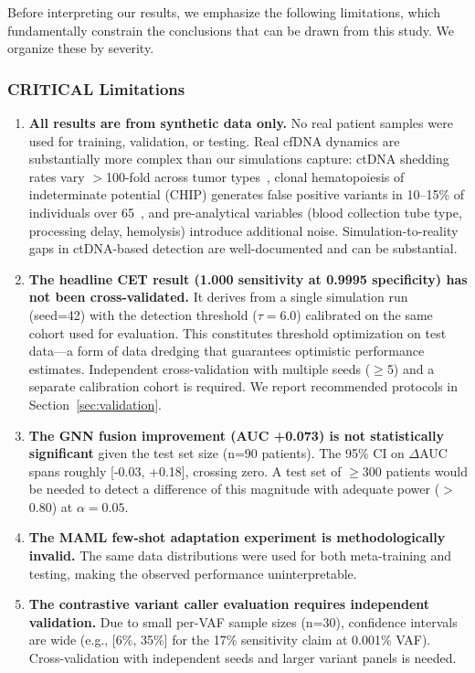 \documentclass[10pt,a4paper]{article}
\begin{document}
Before interpreting our results, we emphasize the following limitations, which fundamentally constrain the conclusions that can be drawn from this study. We organize these by severity.

\subsubsection{CRITICAL Limitations}

\begin{enumerate}
\item \textbf{All results are from synthetic data only.} No real patient samples were used for training, validation, or testing. Real cfDNA dynamics are substantially more complex than our simulations capture: ctDNA shedding rates vary $>$100-fold across tumor types~\cite{avanzini2020mathematical}, clonal hematopoiesis of indeterminate potential (CHIP) generates false positive variants in 10--15\% of individuals over 65~\cite{razavi2019high,genovese2014clonal}, and pre-analytical variables (blood collection tube type, processing delay, hemolysis) introduce additional noise. Simulation-to-reality gaps in ctDNA-based detection are well-documented and can be substantial.

\item \textbf{The headline CET result (1.000 sensitivity at 0.9995 specificity) has not been cross-validated.} It derives from a single simulation run (seed=42) with the detection threshold ($\tau = 6.0$) calibrated on the same cohort used for evaluation. This constitutes threshold optimization on test data—a form of data dredging that guarantees optimistic performance estimates. Independent cross-validation with multiple seeds ($\geq$5) and a separate calibration cohort is required. We report recommended protocols in Section~\ref{sec:validation}.

\item \textbf{The GNN fusion improvement (AUC +0.073) is not statistically significant} given the test set size (n=90 patients). The 95\% CI on $\Delta$AUC spans roughly [-0.03, +0.18], crossing zero. A test set of $\geq$300 patients would be needed to detect a difference of this magnitude with adequate power ($>$0.80) at $\alpha = 0.05$.

\item \textbf{The MAML few-shot adaptation experiment is methodologically invalid.} The same data distributions were used for both meta-training and testing, making the observed performance uninterpretable.

\item \textbf{The contrastive variant caller evaluation requires independent validation.} Due to small per-VAF sample sizes (n=30), confidence intervals are wide (e.g., [6\%, 35\%] for the 17\% sensitivity claim at 0.001\% VAF). Cross-validation with independent seeds and larger variant panels is needed.
\end{enumerate}
\end{document}

